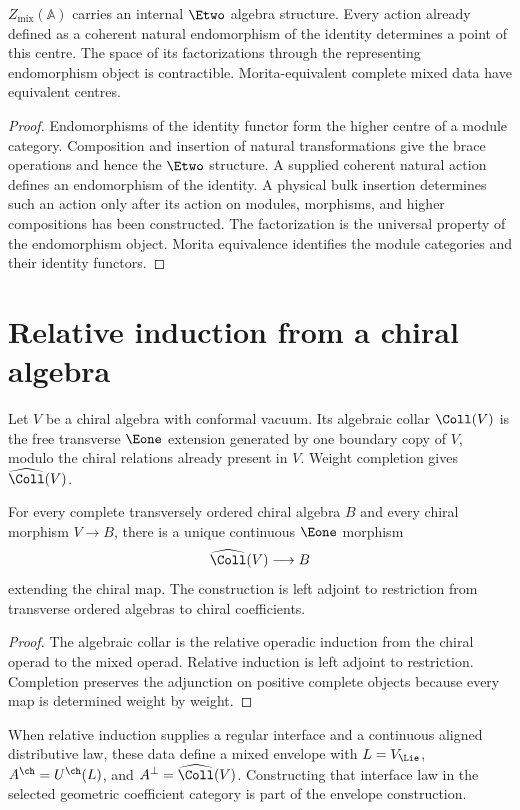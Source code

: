 \begin{theorem}
$Z_{\mathrm{mix}}(\mathbb A)$ carries an internal $\Etwo$ algebra structure.  Every action already defined as a coherent natural endomorphism of the identity determines a point of this centre. The space of its factorizations through the representing endomorphism object is contractible.  Morita-equivalent complete mixed data have equivalent centres.
\end{theorem}
\begin{proof}
Endomorphisms of the identity functor form the higher centre of a module category.  Composition and insertion of natural transformations give the brace operations and hence the $\Etwo$ structure.  A supplied coherent natural action defines an endomorphism of the identity. A physical bulk insertion determines such an action only after its action on modules, morphisms, and higher compositions has been constructed.  The factorization is the universal property of the endomorphism object.  Morita equivalence identifies the module categories and their identity functors.
\end{proof}

\chapter{Relative induction from a chiral algebra}
Let $V$ be a chiral algebra with conformal vacuum.  Its algebraic collar $\Coll(V)$ is the free transverse $\Eone$ extension generated by one boundary copy of $V$, modulo the chiral relations already present in $V$.  Weight completion gives $\widehat\Coll(V)$.

\begin{theorem}
For every complete transversely ordered chiral algebra $B$ and every chiral morphism $V\to B$, there is a unique continuous $\Eone$ morphism
\[
 \widehat\Coll(V)\longrightarrow B
\]
extending the chiral map.  The construction is left adjoint to restriction from transverse ordered algebras to chiral coefficients.
\end{theorem}
\begin{proof}
The algebraic collar is the relative operadic induction from the chiral operad to the mixed operad.  Relative induction is left adjoint to restriction.  Completion preserves the adjunction on positive complete objects because every map is determined weight by weight.
\end{proof}

When relative induction supplies a regular interface and a continuous aligned distributive law, these data define a mixed envelope with $L=V_{\Lie}$, $A^{\ch}=U^{\ch}(L)$, and $A^\perp=\widehat\Coll(V)$. Constructing that interface law in the selected geometric coefficient category is part of the envelope construction.


